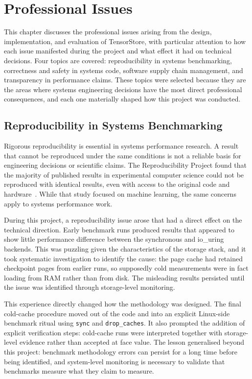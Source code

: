 \chapter{Professional Issues}
\label{chap:professional_issues}

This chapter discusses the professional issues arising from the design, implementation, and evaluation of TensorStore, with particular attention to how each issue manifested during the project and what effect it had on technical decisions. Four topics are covered: reproducibility in systems benchmarking, correctness and safety in systems code, software supply chain management, and transparency in performance claims. These topics were selected because they are the areas where systems engineering decisions have the most direct professional consequences, and each one materially shaped how this project was conducted.

\section{Reproducibility in Systems Benchmarking}

Rigorous reproducibility is essential in systems performance research. A result that cannot be reproduced under the same conditions is not a reliable basis for engineering decisions or scientific claims. The Reproducibility Project found that the majority of published results in experimental computer science could not be reproduced with identical results, even with access to the original code and hardware~\cite{reproducibility2015}. While that study focused on machine learning, the same concerns apply to systems performance work.

During this project, a reproducibility issue arose that had a direct effect on the technical direction. Early benchmark runs produced results that appeared to show little performance difference between the synchronous and io\_uring backends. This was puzzling given the characteristics of the storage stack, and it took systematic investigation to identify the cause: the page cache had retained checkpoint pages from earlier runs, so supposedly cold measurements were in fact loading from RAM rather than from disk. The misleading results persisted until the issue was identified through storage-level monitoring.

This experience directly changed how the methodology was designed. The final cold-cache procedure moved out of the code and into an explicit Linux-side benchmark ritual using \texttt{sync} and \texttt{drop\_caches}. It also prompted the addition of explicit verification steps: cold-cache runs were interpreted together with storage-level evidence rather than accepted at face value. The lesson generalised beyond this project: benchmark methodology errors can persist for a long time before being identified, and system-level monitoring is necessary to validate that benchmarks measure what they claim to measure.


